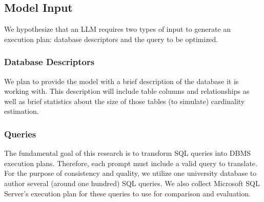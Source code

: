 \subsection{Model Input}
We hypothesize that an LLM requires two types of input to generate an execution plan: database descriptors and the query to be optimized.

\subsubsection{Database Descriptors}
We plan to provide the model with a brief description of the database it is working with. This description will include table columns and relationships as well as brief statistics about the size of those tables (to simulate) cardinality estimation.

\subsubsection{Queries}
The fundamental goal of this research is to transform SQL queries into DBMS execution plans. Therefore, each prompt must include a valid query to translate. For the purpose of consistency and quality, we utilize one university database to author several (around one hundred) SQL queries. We also collect Microsoft SQL Server's execution plan for these queries to use for comparison and evaluation.
